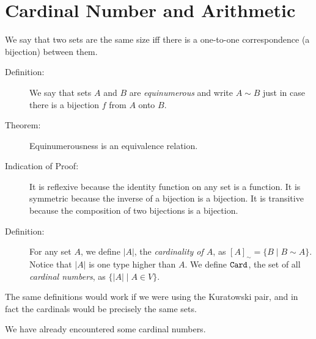 \documentclass[12pt]{book}
\begin{document}
\newpage

\section{Cardinal Number and Arithmetic}

We say that two sets are the same size iff there is a one-to-one
correspondence (a bijection) between them.

\begin{description}

\item[Definition:] We say that sets $A$ and $B$ are {\em
equinumerous\/} and write $A \sim B$ just in case there is a bijection
$f$ from $A$ onto $B$.

\item[Theorem:]  Equinumerousness is an equivalence relation.

\item[Indication of Proof:] It is reflexive because the identity
function on any set is a function.  It is symmetric because the
inverse of a bijection is a bijection.  It is transitive because the
composition of two bijections is a bijection.

\item[Definition:] For any set $A$, we define $|A|$, the {\em cardinality
of $A$\/}, as $[A]_{\sim} = \{B \mid B \sim A\}$.  Notice that $|A|$ is
one type higher than $A$.  We define ${\tt Card}$, the set of all {\em cardinal numbers\/}, as $\{|A| \mid A \in V\}$.

\end{description}

The same definitions would work if we were using the Kuratowski pair,
and in fact the cardinals would be precisely the same sets.

We have already encountered some cardinal numbers.
\end{document}
